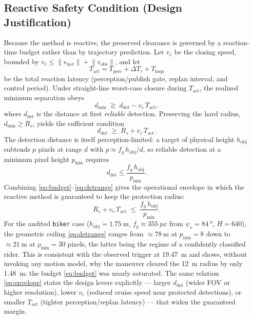 \subsection{Reactive Safety Condition (Design Justification)}
\label{subsec:budget}
Because the method is reactive, the preserved clearance is governed by a
reaction-time budget rather than by trajectory prediction. Let $v_c$ be the
closing speed, bounded by $v_c\le\lVert v_{\text{uav}}\rVert+\lVert
v_{\text{obs}}\rVert$, and let
\begin{equation}
T_{\text{act}}=T_{\text{perc}}+\Delta T_r+T_{\text{loop}}
\end{equation}
be the total reaction latency (perception/publish gate, replan interval, and
control period). Under straight-line worst-case closure during $T_{\text{act}}$,
the realized minimum separation obeys
\begin{equation}
d_{\min}\;\gtrsim\;d_{\text{det}}-v_c\,T_{\text{act}},
\label{eq:dmin}
\end{equation}
where $d_{\text{det}}$ is the distance at first \emph{reliable} detection.
Preserving the hard radius, $d_{\min}\ge R_s$, yields the sufficient condition
\begin{equation}
\boxed{\,d_{\text{det}}\;\ge\;R_s+v_c\,T_{\text{act}}\,.}
\label{eq:budget}
\end{equation}
The detection distance is itself perception-limited: a target of physical
height $h_{\text{obj}}$ subtends $p$ pixels at range $d$ with
$p\approx f_y\,h_{\text{obj}}/d$, so reliable detection at a minimum pixel
height $p_{\min}$ requires
\begin{equation}
d_{\text{det}}\le \frac{f_y\,h_{\text{obj}}}{p_{\min}}.
\label{eq:detrange}
\end{equation}
Combining \eqref{eq:budget}--\eqref{eq:detrange} gives the operational envelope
in which the reactive method is guaranteed to keep the protection radius:
\begin{equation}
R_s+v_c\,T_{\text{act}}\;\le\;\frac{f_y\,h_{\text{obj}}}{p_{\min}}.
\label{eq:envelope}
\end{equation}
For the audited \texttt{biker} case ($h_{\text{obj}}=\SI{1.75}{\meter}$,
$f_y\approx\SI{355}{px}$ from $\psi_v=\SI{84}{\degree}$, $H=640$), the
geometric ceiling \eqref{eq:detrange} ranges from $\approx\SI{78}{\meter}$ at
$p_{\min}=8$ down to $\approx\SI{21}{\meter}$ at $p_{\min}=30$ pixels, the
latter being the regime of a confidently classified rider. This is consistent
with the observed trigger at \SI{19.47}{\meter} and shows, without invoking any
motion model, why the maneuver cleared the \SI{12}{\meter} radius by only
\SI{1.48}{\meter}: the budget \eqref{eq:budget} was nearly saturated. The same
relation \eqref{eq:envelope} states the design levers explicitly — larger
$d_{\text{det}}$ (wider FOV or higher resolution), lower $v_c$ (reduced cruise
speed near protected detections), or smaller $T_{\text{act}}$ (tighter
perception/replan latency) — that widen the guaranteed margin.
